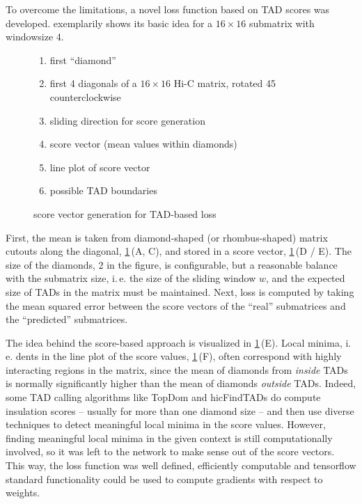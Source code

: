 To overcome the limitations, a novel loss function based on TAD scores \cite{Crane2015} was developed.
 exemplarily shows its basic idea for a $16\times16$ submatrix
with windowsize 4.
\begin{figure}[hbt]
 \begin{minipage}{0.65\textwidth}
    \caption{score vector generation for TAD-based loss}
    \label{fig:improve:tad_score_loss_function}
 \end{minipage}\hfill
 \begin{minipage}{0.3\textwidth}
 \scriptsize
  \begin{enumerate}[label=\Alph*:,leftmargin=*]
   \raggedright
    \item first ``diamond''
    \item first 4 diagonals of a $16\times16$ Hi-C matrix, rotated \SI{45}{\deg} counterclockwise
    \item sliding direction for score generation
    \item score vector (mean values within diamonds)
    \item line plot of score vector
    \item possible TAD boundaries
\end{enumerate}
 \end{minipage}
\end{figure}
First, the mean is taken from diamond-shaped (or rhombus-shaped) matrix cutouts along the diagonal, \cref{fig:improve:tad_score_loss_function}\,(A, C),
and stored in a score vector, \cref{fig:improve:tad_score_loss_function}\,(D / E). 
The size of the diamonds, 2 in the figure, is configurable, but a reasonable balance with the submatrix size, i.\,e. the size of the sliding window $w$,
and the expected size of TADs in the matrix must be maintained.
Next, loss is computed by taking the mean squared error between the score vectors of the ``real'' submatrices and the ``predicted'' submatrices.

The idea behind the score-based approach is visualized in \cref{fig:improve:tad_score_loss_function}\,(E).
Local minima, i.\,e. dents in the line plot of the score values, \cref{fig:improve:tad_score_loss_function}\,(F),
often correspond with highly interacting regions in the matrix, since the mean of diamonds from \emph{inside} TADs is normally significantly higher than the mean of diamonds \emph{outside} TADs.
Indeed, some TAD calling algorithms like TopDom \cite{Shin2015} and hicFindTADs \cite[W12f.]{Wolff2018} do compute insulation scores -- usually for more than one diamond size -- 
and then use diverse techniques to detect meaningful local minima in the score values.
However, finding meaningful local minima in the given context is still computationally involved,
so it was left to the network to make sense out of the score vectors.
This way, the loss function was well defined, efficiently computable and tensorflow standard functionality could be used to compute gradients with respect to weights.

